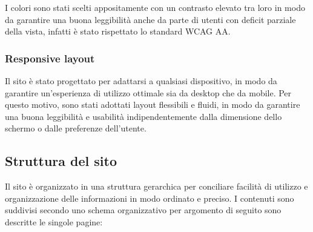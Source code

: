 I colori sono stati scelti appositamente con un contrasto elevato tra loro in
modo da garantire una buona leggibilità anche da parte di utenti con deficit
parziale della vista, infatti è stato rispettato lo standard WCAG AA.

\subsubsection{Responsive layout}

Il sito è stato progettato per adattarsi a qualsiasi dispositivo, in modo da
garantire un'esperienza di utilizzo ottimale sia da desktop che da mobile. Per
questo motivo, sono stati adottati layout flessibili e fluidi, in modo da
garantire una buona leggibilità e usabilità indipendentemente dalla dimensione
dello schermo o dalle preferenze dell'utente.

\subsection{Struttura del sito}

Il sito è organizzato in una struttura gerarchica per conciliare facilità di utilizzo e organizzazione delle informazioni in modo ordinato e preciso. I contenuti sono suddivisi secondo uno schema organizzativo per argomento di seguito sono descritte le singole pagine:

